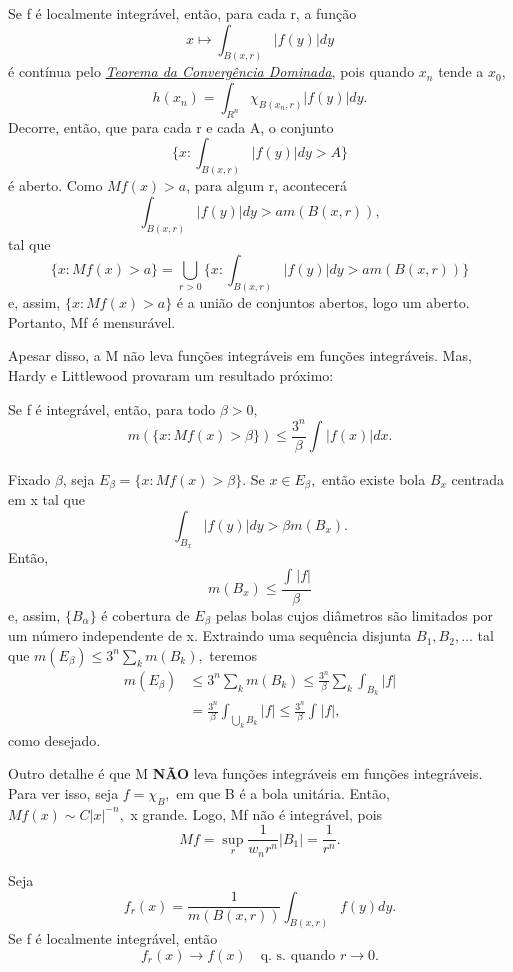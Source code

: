 \documentclass[MeasureTheory/measure_theory.tex]{subfiles}
\begin{document}
Se f é localmente integrável, então, para cada r, a função
\[
	x\mapsto \int_{B(x, r)}|f(y)| dy
\]
é contínua pelo \hyperlink{dominated_convergence}{\textit{Teorema da Convergência Dominada}}, pois quando \(x_{n}\) tende a \(x_{0}\),
\[
	h(x_{n}) = \int_{R^{n}}\chi_{B(x_{n}, r)}|f(y)| dy.
\]
Decorre, então, que para cada r e cada A, o conjunto
\[
	\biggl\{x: \int_{B(x, r)}|f(y)| dy  > A\biggr\}
\]
é aberto. Como \(Mf(x) > a\), para algum r, acontecerá
\[
	\int_{B(x, r)}|f(y)| dy > am(B(x, r)),
\]
tal que
\[
	\{x: Mf(x) > a\} = \bigcup_{r>0}^{}\biggl\{x: \int_{B(x, r)}|f(y)| dy > am(B(x, r))\biggr\}
\]
e, assim, \(\{x: Mf(x) > a\}\) é a união de conjuntos abertos, logo um aberto. Portanto, Mf é mensurável.

Apesar disso, a M não leva funções integráveis em funções integráveis. Mas, Hardy e Littlewood provaram um resultado próximo:
\begin{theorem*}
	Se f é integrável, então, para todo \(\beta > 0,\)
	\[
		m(\{x: Mf(x) > \beta \})\leq \frac{3^{n}}{\beta }\int_{}^{}|f(x)|dx.
	\]
\end{theorem*}
\begin{proof*}
	Fixado \(\beta \), seja \(E_{\beta } = \{x: Mf(x) > \beta \}.\) Se \(x\in E_{\beta },\) então existe bola \(B_{x}\) centrada em x tal que
	\[
		\int_{B_{x}}|f(y)| dy > \beta m (B_{x}).
	\]
	Então,
	\[
		m(B_{x}) \leq \frac{\int_{}^{}|f|}{\beta }
	\]
	e, assim, \(\{B_{\alpha }\}\) é cobertura de \(E_{\beta }\) pelas bolas cujos diâmetros são limitados por um número independente de x. Extraindo uma sequência disjunta \(B_{1}, B_2, \dotsc \) tal que \(m(E_{\beta }) \leq 3^{n}\sum\limits_{k}^{}m(B_{k}),\) teremos
	\begin{align*}
		m(E_{\beta }) & \leq 3^{n}\sum\limits_{k}^{}m(B_{k}) \leq \frac{3^{n}}{\beta }\sum\limits_{k}^{}\int_{B_{k}}|f| \\
		              & = \frac{3^{n}}{\beta }\int_{\bigcup_{k}^{}B_{k}}|f| \leq \frac{3^{n}}{\beta }\int_{}^{}|f|,
	\end{align*}
	como desejado. \qedsymbol
\end{proof*}
\begin{example}
	Outro detalhe é que M \textbf{NÃO} leva funções integráveis em funções integráveis. Para ver isso, seja \(f = \chi_{B},\) em que B é a bola unitária. Então, \(Mf(x)\sim C|x|^{-n},\) x grande. Logo, Mf não é integrável, pois
	\[
		Mf = \sup_{r}\frac{1}{w_{n}r^{n}}|B_1| = \frac{1}{r^{n}}.
	\]
\end{example}
\begin{theorem*}
	Seja
	\[
		f_{r}(x) = \frac{1}{m(B(x, r))}\int_{B(x, r)}f(y)dy.
	\]
	Se f é localmente integrável, então
	\[
		f_{r}(x)\to f(x)\quad \text{q. s. quando }r\to 0.
	\]
\end{theorem*}
\end{document}
